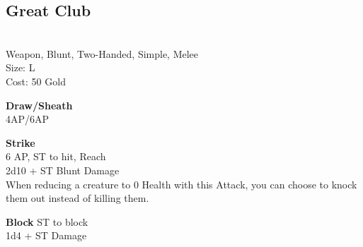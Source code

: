 \subsection{Great Club}\label{weapon:greatClub}\\
Weapon, Blunt, Two-Handed, Simple, Melee\\
Size: L\\
Cost: 50 Gold

\textbf{Draw/Sheath}\\
4AP/6AP

\textbf{Strike} \\
6 AP, ST to hit,  Reach\\
2d10 + \texttimes ST Blunt Damage\\
When reducing a creature to 0 Health with this Attack, you can choose to knock them out instead of killing them.

\textbf{Block}
ST to block\\
1d4 + \texttimes ST Damage

